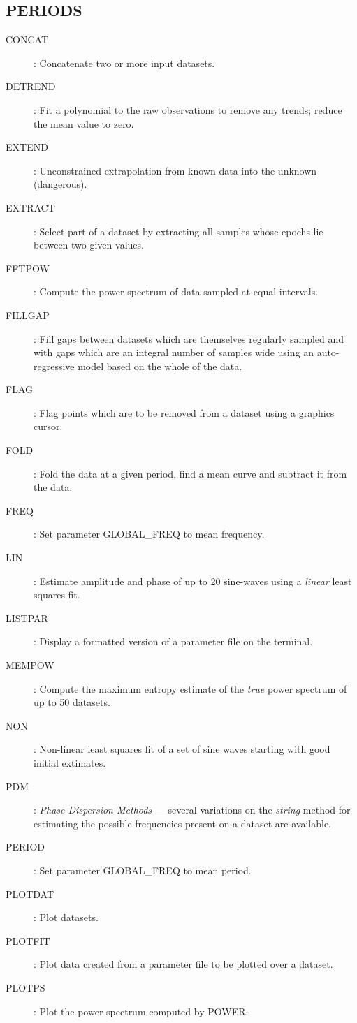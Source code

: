 \subsection {PERIODS}
\begin{description}
\item [CONCAT]: Concatenate two or more input datasets.
\item [DETREND]: Fit a polynomial to the raw observations to remove any trends;
reduce the mean value to zero.
\item [EXTEND]: Unconstrained extrapolation from known data into the unknown
(dangerous).
\item [EXTRACT]: Select part of a dataset by extracting all samples whose epochs
lie between two given values.
\item [FFTPOW]: Compute the power spectrum of data sampled at equal intervals.
\item [FILLGAP]: Fill gaps between datasets which are themselves regularly
sampled and with gaps which are an integral number of samples wide using an
auto-regressive model based on the whole of the data.
\item [FLAG]: Flag points which are to be removed from a dataset using a graphics
cursor.
\item [FOLD]: Fold the data at a given period, find a mean curve and subtract
it from the data.
\item [FREQ]: Set parameter GLOBAL\_FREQ to mean frequency.
\item [LIN]: Estimate amplitude and phase of up to 20 sine-waves using a
{\em linear} least squares fit.
\item [LISTPAR]: Display a formatted version of a parameter file on the
terminal.
\item [MEMPOW]: Compute the maximum entropy estimate of the {\em true} power
spectrum of up to 50 datasets.
\item [NON]: Non-linear least squares fit of a set of sine waves starting with
good initial extimates.
\item [PDM]: {\em Phase Dispersion Methods} --- several variations on the
{\em string} method for estimating the possible frequencies present on a
dataset are available.
\item [PERIOD]: Set parameter GLOBAL\_FREQ to mean period.
\item [PLOTDAT]: Plot datasets.
\item [PLOTFIT]: Plot data created from a parameter file to be plotted over a
dataset.
\item [PLOTPS]: Plot the power spectrum computed by POWER.

\end{description}
